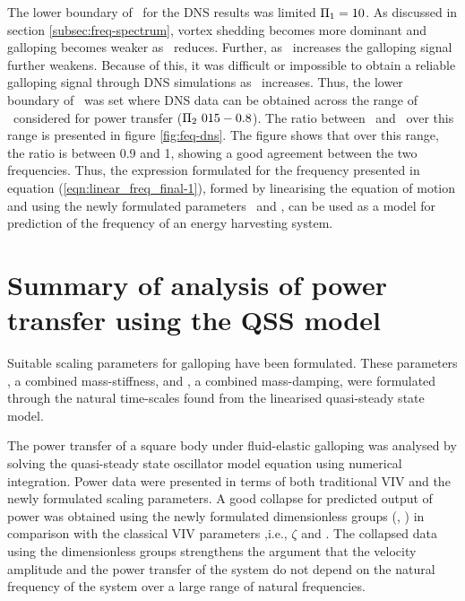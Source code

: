   


The lower boundary of \massstiff\ for the DNS results was limited $\Pi_1=10$. As discussed in section \ref{subsec:freq-spectrum}, vortex shedding becomes more dominant and galloping becomes weaker as \massstiff\ reduces.  Further, as \massdamp\ increases the galloping signal further weakens. Because of this, it was difficult or impossible to obtain a reliable galloping signal through DNS simulations as \massdamp\ increases.  Thus, the lower boundary of \massstiff\  was set where DNS data can be obtained across the range of \massdamp\ considered for power transfer ($\massdamp\ 015-0.8$). The ratio between \freqlin\ and \freqdns\ over this range is presented in figure \ref{fig:feq-dns}. The figure shows that over this range, the ratio is between 0.9 and 1,  showing a good agreement between the two frequencies. Thus, the expression formulated for the frequency presented in equation (\ref{eqn:linear_freq_final-1}), formed by linearising the equation of motion and using the newly formulated parameters \massstiff\ and \massdamp, can be used as a model for prediction of the frequency of an energy harvesting system.  


\section{Summary of analysis of power transfer using the QSS model}
\label{sec:summary-pi_1-pi_2}

Suitable scaling parameters for galloping have been formulated. These parameters \massstiff, a combined mass-stiffness, and \massdamp, a combined mass-damping, were formulated through the natural time-scales found from the linearised quasi-steady state model.   

The power transfer of a square body under fluid-elastic galloping was analysed by solving the quasi-steady state oscillator model equation using numerical  integration. Power data were presented in terms of both traditional VIV and the newly formulated scaling parameters. A good collapse for predicted output of power was obtained using the newly formulated  dimensionless groups (\massstiff, \massdamp) in comparison with the classical VIV parameters ,i.e., $\zeta$ and \ustar. The collapsed data using the dimensionless groups strengthens the argument that the velocity amplitude and the power transfer of the system do not depend on the natural frequency of the system over a large range of natural frequencies.

